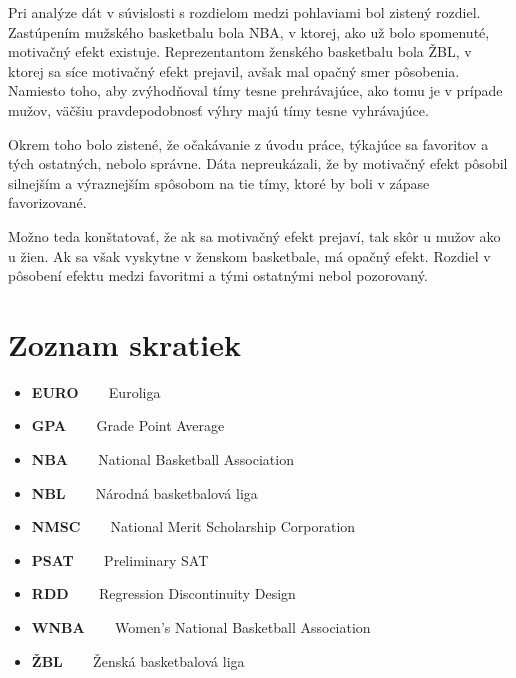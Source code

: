 \documentclass[
  digital, %
  twoside, %
  notable,   %
  lof,     %
  lot,     %
]{fithesis3}
\begin{document}
	Pri analýze dát v súvislosti s rozdielom medzi pohlaviami bol zistený rozdiel. Zastúpením mužského basketbalu bola NBA, v ktorej, ako už bolo spomenuté, motivačný efekt existuje. Reprezentantom ženského basketbalu bola ŽBL, v ktorej sa síce motivačný efekt prejavil, avšak mal opačný smer pôsobenia. Namiesto toho, aby zvýhodňoval tímy tesne prehrávajúce, ako tomu je v prípade mužov, väčšiu pravdepodobnosť výhry majú tímy tesne vyhrávajúce.
	
	Okrem toho bolo zistené, že očakávanie z úvodu práce, týkajúce sa favoritov a tých ostatných, nebolo správne. Dáta nepreukázali, že by motivačný efekt pôsobil silnejším a výraznejším spôsobom na tie tímy, ktoré by boli v zápase favorizované.
	
	Možno teda konštatovať, že ak sa motivačný efekt prejaví, tak skôr u mužov ako u žien. Ak sa však vyskytne v ženskom basketbale, má opačný efekt. Rozdiel v pôsobení efektu medzi favoritmi a tými ostatnými nebol pozorovaný.
	


\printbibliography[heading=bibintoc] %

\listoffigures
{}	


\listoftables
{}


	\chapter*{Zoznam skratiek}
	{\renewcommand\labelitemi{}
	\begin{itemize}
	\item \textbf{EURO} ~~~ Euroliga
	\item \textbf{GPA} ~~~ Grade Point Average
	\item \textbf{NBA} ~~~ National Basketball Association
	\item \textbf{NBL} ~~~ Národná basketbalová liga
	\item \textbf{NMSC} ~~~ National Merit Scholarship Corporation
	\item \textbf{PSAT} ~~~ Preliminary SAT
	\item \textbf{RDD} ~~~ Regression Discontinuity Design
	\item \textbf{WNBA} ~~~ Women's National Basketball Association
	\item \textbf{ŽBL} ~~~ Ženská basketbalová liga
	\end{itemize}}
\end{document}
